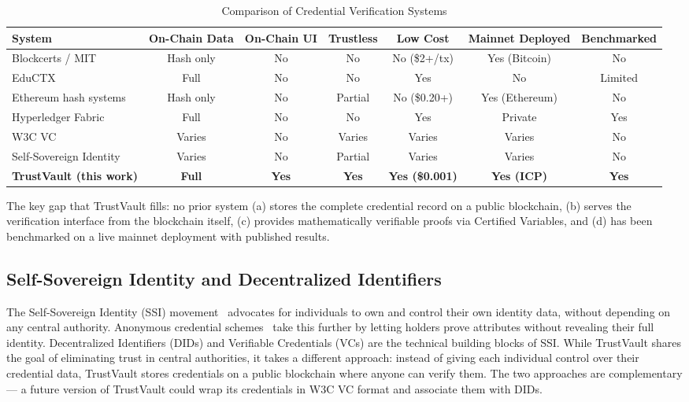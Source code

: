 \documentclass[journal]{IEEEtran}
\begin{document}
\begin{table}[t]
\caption{Comparison of Credential Verification Systems}
\label{tab:related_comparison}
\centering\small\renewcommand{\arraystretch}{1.2}
\begin{tabular}{@{}lcccccc@{}}
\toprule
\textbf{System} & \textbf{On-Chain Data} & \textbf{On-Chain UI} & \textbf{Trustless} & \textbf{Low Cost} & \textbf{Mainnet Deployed} & \textbf{Benchmarked} \\
\midrule
Blockcerts / MIT~\cite{grech2017blockchain}        & Hash only  & No  & No  & No (\$2+/tx)  & Yes (Bitcoin) & No \\
EduCTX~\cite{turk2018eductx}                       & Full       & No  & No  & Yes           & No            & Limited \\
Ethereum hash systems~\cite{lizcano2020blockchain}  & Hash only  & No  & Partial & No (\$0.20+) & Yes (Ethereum) & No \\
Hyperledger Fabric~\cite{androulaki2018fabric}      & Full       & No  & No  & Yes           & Private       & Yes \\
W3C VC~\cite{w3c2022vc}                            & Varies     & No  & Varies & Varies       & Varies        & No \\
Self-Sovereign Identity~\cite{allen2016decentralized} & Varies  & No  & Partial & Varies       & Varies        & No \\
\textbf{TrustVault (this work)}                     & \textbf{Full} & \textbf{Yes} & \textbf{Yes} & \textbf{Yes (\$0.001)} & \textbf{Yes (ICP)} & \textbf{Yes} \\
\bottomrule
\end{tabular}
\end{table}

The key gap that TrustVault fills: no prior system (a) stores the complete credential record on a public blockchain, (b) serves the verification interface from the blockchain itself, (c) provides mathematically verifiable proofs via Certified Variables, and (d) has been benchmarked on a live mainnet deployment with published results.

\subsection{Self-Sovereign Identity and Decentralized Identifiers}

The Self-Sovereign Identity (SSI) movement~\cite{allen2016decentralized} advocates for individuals to own and control their own identity data, without depending on any central authority. Anonymous credential schemes~\cite{camenisch2001efficient} take this further by letting holders prove attributes without revealing their full identity. Decentralized Identifiers (DIDs) and Verifiable Credentials (VCs) are the technical building blocks of SSI. While TrustVault shares the goal of eliminating trust in central authorities, it takes a different approach: instead of giving each individual control over their credential data, TrustVault stores credentials on a public blockchain where anyone can verify them. The two approaches are complementary — a future version of TrustVault could wrap its credentials in W3C VC format and associate them with DIDs.
\end{document}
